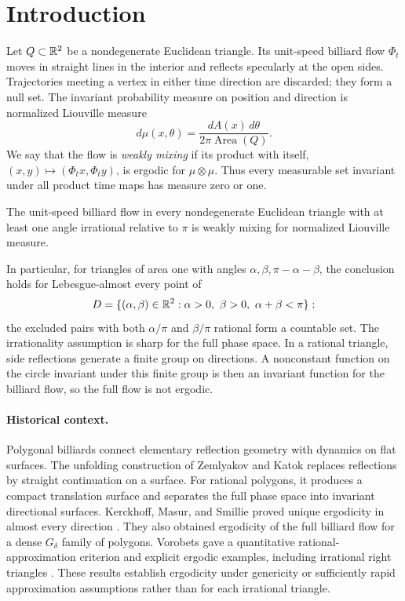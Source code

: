 \section{Introduction}

Let \(Q\subset\mathbb R^2\) be a nondegenerate Euclidean triangle. Its unit-speed
billiard flow \(\Phi_t\) moves in straight lines in the interior and reflects
specularly at the open sides. Trajectories meeting a vertex in either time
direction are discarded; they form a null set. The invariant probability
measure on position and direction is normalized Liouville measure
\[
 d\mu(x,\theta)=\frac{dA(x)\,d\theta}{2\pi\operatorname{Area}(Q)}.
\]
We say that the flow is \emph{weakly mixing} if its product with itself,
\((x,y)\mapsto(\Phi_t x,\Phi_t y)\), is ergodic for
\(\mu\otimes\mu\). Thus every measurable set invariant under all product
time maps has measure zero or one.

\begin{theorem}\label{thm:main}
The unit-speed billiard flow in every nondegenerate Euclidean triangle with
at least one angle irrational relative to \(\pi\) is weakly mixing for
normalized Liouville measure.
\end{theorem}

In particular, for triangles of area one with angles
\(\alpha,\beta,\pi-\alpha-\beta\), the conclusion holds for
Lebesgue-almost every point of
\[
 D=\{(\alpha,\beta)\in\R^2:\alpha>0,\ \beta>0,\ \alpha+\beta<\pi\}:
\]
the excluded pairs with both \(\alpha/\pi\) and \(\beta/\pi\) rational
form a countable set. The irrationality assumption is sharp for the full
phase space. In a rational triangle, side reflections generate a finite
group on directions. A nonconstant function on the circle invariant under
this finite group is then an invariant function for the billiard flow, so
the full flow is not ergodic.

\paragraph{Historical context.}
Polygonal billiards connect elementary reflection geometry with dynamics
on flat surfaces. The unfolding construction of Zemlyakov and Katok
\cite{ZK} replaces reflections by straight continuation on a surface.
For rational polygons, it produces a compact translation surface and
separates the full phase space into invariant directional surfaces.
Kerckhoff, Masur, and Smillie proved unique ergodicity in almost every
direction \cite{KMS}. They also obtained ergodicity of the full billiard
flow for a dense \(G_\delta\) family of polygons. Vorobets gave a
quantitative rational-approximation criterion and explicit ergodic
examples, including irrational right triangles \cite{Vorobets}.
These results establish ergodicity under genericity or sufficiently rapid
approximation assumptions rather than for each irrational triangle.

